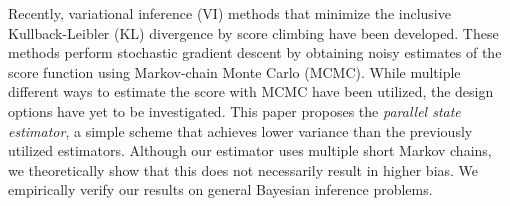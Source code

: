 
Recently, variational inference (VI) methods that minimize the inclusive Kullback-Leibler (KL) divergence by score climbing have been developed.
These methods perform stochastic gradient descent by obtaining noisy estimates of the score function using Markov-chain Monte Carlo (MCMC).
While multiple different ways to estimate the score with MCMC have been utilized, the design options have yet to be investigated.
This paper proposes the \textit{parallel state estimator}, a simple scheme that achieves lower variance than the previously utilized estimators.
Although our estimator uses multiple short Markov chains, we theoretically show that this does not necessarily result in higher bias.
We empirically verify our results on general Bayesian inference problems.



